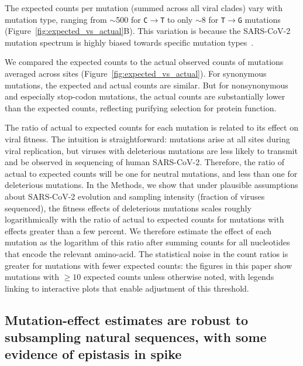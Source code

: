 \documentclass[9pt,twocolumn,twoside]{gsajnl_modified}
\begin{document}
The expected counts per mutation (summed across all viral clades) vary with mutation type, ranging from $\sim$500 for \texttt{C$\rightarrow$T} to only $\sim$8 for \texttt{T$\rightarrow$G} mutations (Figure~\ref{fig:expected_vs_actual}B).
This variation is because the SARS-CoV-2 mutation spectrum is highly biased towards specific mutation types~\citep{bloom2022evolution,ruis2022mutational,de2021mutation}.

We compared the expected counts to the actual observed counts of mutations averaged across sites (Figure~\ref{fig:expected_vs_actual}).
For synonymous mutations, the expected and actual counts are similar.
But for nonsynonymous and especially stop-codon mutations, the actual counts are substantially lower than the expected counts, reflecting purifying selection for protein function.

The ratio of actual to expected counts for each mutation is related to its effect on viral fitness.
The intuition is straightforward: mutations arise at all sites during viral replication, but viruses with deleterious mutations are less likely to transmit and be observed in sequencing of human SARS-CoV-2.
Therefore, the ratio of actual to expected counts will be one for neutral mutations, and less than one for deleterious mutations.
In the Methods, we show that under plausible assumptions about SARS-CoV-2 evolution and sampling intensity (fraction of viruses sequenced), the fitness effects of deleterious mutations scales roughly logarithmically with the ratio of actual to expected counts for mutations with effects greater than a few percent.
We therefore estimate the effect of each mutation as the logarithm of this ratio after summing counts for all nucleotides that encode the relevant amino-acid.
The statistical noise in the count ratios is greater for mutations with fewer expected counts: the figures in this paper show mutations with $\ge10$ expected counts unless otherwise noted, with legends linking to interactive plots that enable adjustment of this threshold.

\subsection*{Mutation-effect estimates are robust to subsampling natural sequences, with some evidence of epistasis in spike}
\end{document}

